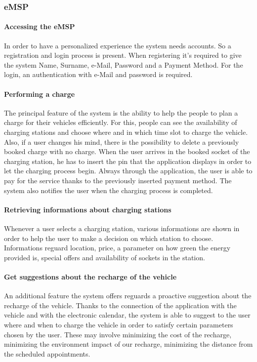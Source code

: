 \subsubsection{\ac{eMSP}}
\paragraph{Accessing the \ac{eMSP}}
In order to have a personalized experience the system needs accounts. So a registration and login process is present. When registering it's required to give the system Name, Surname, e-Mail, Password and a Payment Method. For the login, an authentication with e-Mail and password is required.

\paragraph{Performing a charge}
The principal feature of the system is the ability to help the people to plan a charge for their vehicles efficiently. For this, people can see the availability of charging stations and choose where and in which time slot to charge the vehicle.
Also, if a user changes his mind, there is the possibility to delete a previously booked charge with no charge.
When the user arrives in the booked socket of the charging station, he has to insert the pin that the application displays in order to let the charging process begin.
Always through the application, the user is able to pay for the service thanks to the previously inserted payment method.
The system also notifies the user when the charging process is completed.

\paragraph{Retrieving informations about charging stations}
Whenever a user selects a charging station, various informations are shown in order to help the user to make a decision on which station to choose. Informations reguard location, price, a parameter on how green the energy provided is, special offers and availability of sockets in the station.

\paragraph{Get suggestions about the recharge of the vehicle}
An additional feature the system offers reguards a proactive suggestion about the recharge of the vehicle. Thanks to the connection of the application with the vehicle and with the electronic calendar, the system is able to suggest to the user where and when to charge the vehicle in order to satisfy certain parameters chosen by the user. These may involve minimizing the cost of the recharge, minimizing the environment impact of our recharge, minimizing the distance from the scheduled appointments.


